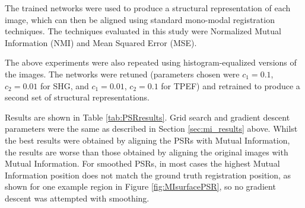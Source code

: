 \documentclass{report}
\begin{document}
The trained networks were used to produce a structural representation of each image, which can then be aligned using standard mono-modal registration techniques. The techniques evaluated in this study were Normalized Mutual Information (NMI) and Mean Squared Error (MSE). %

The above experiments were also repeated using histogram-equalized versions of the images. The networks were retuned (parameters chosen were $c_1=0.1$, $c_2=0.01$ for SHG, and $c_1=0.01$, $c_2=0.1$ for TPEF) and retrained to produce a second set of structural representations.

Results are shown in Table \ref{tab:PSRresults}. Grid search and gradient descent parameters were the same as described in Section \ref{sec:mi_results} above. Whilst the best results were obtained by aligning the PSRs with Mutual Information, the results are worse than those obtained by aligning the original images with Mutual Information. For smoothed PSRs, in most cases the highest Mutual Information position does not match the ground truth registration position, as shown for one example region in Figure \ref{fig:MIsurfacePSR}, so no gradient descent was attempted with smoothing. 
\end{document}
